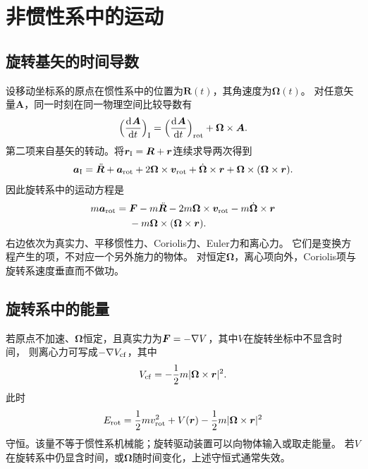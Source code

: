 \chapter{非惯性系中的运动}

\section{旋转基矢的时间导数}
设移动坐标系的原点在惯性系中的位置为$\bm R(t)$，其角速度为$\bm\Omega(t)$。
对任意矢量$\bm A$，同一时刻在同一物理空间比较导数有
\begin{equation}
 \Bigl(\frac{\mathop{}\!\mathrm{d}^{}\bm A}{\mathrm{d}{t}^{}}\Bigr)_\mathrm I
 = \Bigl(\frac{\mathop{}\!\mathrm{d}^{}\bm A}{\mathrm{d}{t}^{}}\Bigr)_{\mathrm{rot}} + \bm\Omega \times \bm A.
 \label{eq:cm-transport}
\end{equation}
第二项来自基矢的转动。将$\bm r_\mathrm I = \bm R + \bm r$连续求导两次得到
\begin{equation}
 \bm a_\mathrm I = \ddot{\bm R} + \bm a_{\mathrm{rot}}
 + 2\bm\Omega \times \bm v_{\mathrm{rot}}
 + \dot{\bm{\Omega}} \times \bm r
 + \bm\Omega \times (\bm\Omega \times \bm r).
\end{equation}
因此旋转系中的运动方程是
\begin{align}
 m\bm a_{\mathrm{rot}} = {}&\bm F - m\ddot{\bm R}
 - 2m\bm\Omega \times \bm v_{\mathrm{rot}}
 - m\dot{\bm{\Omega}} \times \bm r\notag\\
 &-m\bm\Omega \times (\bm\Omega \times \bm r).
 \label{eq:cm-rotating-newton}
\end{align}
右边依次为真实力、平移惯性力、Coriolis力、Euler力和离心力。
它们是变换方程产生的项，不对应一个另外施力的物体。
对恒定$\bm\Omega$，离心项向外，Coriolis项与旋转系速度垂直而不做功。

\section{旋转系中的能量}
若原点不加速、$\bm\Omega$恒定，且真实力为$\bm F = -\nabla V$，其中$V$在旋转坐标中不显含时间，
则离心力可写成$-\nabla V_{\mathrm{cf}}$，其中
\begin{equation}
 V_{\mathrm{cf}} = -\frac12m\lvert\bm\Omega \times \bm r\rvert^2.
\end{equation}
此时
\begin{equation}
 E_{\mathrm{rot}} = \frac12m v_{\mathrm{rot}}^2 + V(\bm r)
 - \frac12m\lvert\bm\Omega \times \bm r\rvert^2
\end{equation}
守恒。该量不等于惯性系机械能；旋转驱动装置可以向物体输入或取走能量。
若$V$在旋转系中仍显含时间，或$\bm\Omega$随时间变化，上述守恒式通常失效。

